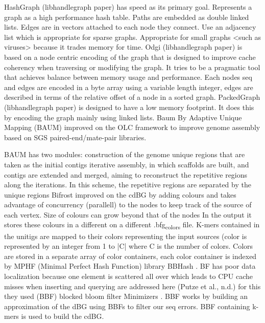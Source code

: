 \documentclass[11pt]{article}
\begin{document}
HashGraph (libhandlegraph paper) has speed as its primary goal. 
Represents a graph as a high performance hash table. 
Paths are embedded as double linked lists. Edges are in vectors attached to 
each node they connect. Use an adjacency list which is appropriate for sparse graphs. 
Appropriate for small graphs <such as viruses> because it trades memory for time.
Odgi (libhandlegraph paper) is based on a node centric encoding of the graph that 
is designed to improve cache coherency when traversing or modifying the graph. 
It tries to be a pragmatic tool that achieves balance between memory usage and
performance. Each nodes seq and edges are encoded in a byte array using a 
variable length integer, edges are described in terms of the relative offset of 
a node in a sorted graph. PackedGraph (libhandlegraph paper) is designed to have
a low memory footprint. 
It does this by encoding the graph mainly using linked lists.
Baum \cite{wangBAUMImprovingGenome2018} By Adaptive Unique Mapping (BAUM) improved
on the OLC framework  to improve genome assembly based on SGS
paired-end/mate-pair libraries.

BAUM has two modules: construction of the genome unique regions that are taken
as the initial contigs iterative assembly, in which scaffolds are built, and 
contigs are extended and merged, aiming to reconstruct the repetitive regions 
along the iterations.
In this scheme, the repetitive regions are separated by the unique regions
Bifrost \cite{holleyBifrostHighlyParallel2019} improved on the cdBG by adding 
colours and takes advantage of concurrency (parallell) to the nodes to keep 
track of the source of each vertex.
Size of colours can grow beyond that of the nodes In the output 
it stores these colours in a different on a different .bfg\textsubscript{colors} file.
K-mers contained in the unitigs are mapped to their colors representing the
input sources (color is represented by an integer from 1 to |C| where C is the
number of colors. Colors are stored in a separate array of color containers,
each color container is indexed by MPHF (Minimal Perfect Hash Function) library
BBHash \cite{limassetFastScalableMinimal2017}.
BF has poor data localization because one element is scattered all over which 
leads to CPU cache misses when inserting and querying are addressed here 
(Putze et al., n.d.) for this they used (BBF) blocked bloom filter 
Minimizers \cite{robertsReducingStorageRequirements2004,grabowskiDiskbasedCompressionData2015}.
BBF works by building an approximation of the dBG using BBFs to filter our
seq errors. 
BBF containing k-mers is used to build the cdBG.
\end{document}
